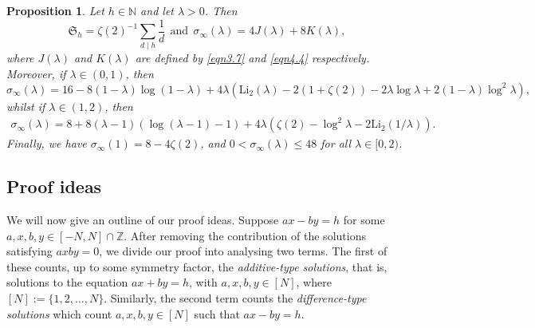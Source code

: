 \documentclass[12pt,reqno]{amsart}
\newtheorem{proposition}[theorem]{Proposition}
\theoremstyle{definition}
\theoremstyle{remark}
\numberwithin{equation}{section}
\def \fS {\mathfrak S}
\def \Li {\mathrm{Li}}
\newcommand\1{\mathds{1}}
\begin{document}
\begin{proposition}\label{prop1.5}
    Let $h \in \mathbb{N}$ and let $\lambda >0$. Then
    \begin{equation}\label{eqn1.4}
    \fS_h= \zeta(2)^{-1}\sum_{d\mid h}\frac{1}{d} \ \ \text{and} \ \  \sigma_{\infty}(\lambda) = 4J(\lambda) + 8K(\lambda),
    \end{equation}
    where $J(\lambda)$ and $K(\lambda)$ are defined by \eqref{eqn3.7} and \eqref{eqn4.4} respectively. Moreover, if $\lambda \in (0,1)$, then
    \begin{equation*}
        \sigma_\infty(\lambda) = 16 - 8(1-\lambda)\log(1-\lambda) + 4\lambda(\Li_2(\lambda) - 2(1+\zeta(2)) - 2\lambda\log\lambda + 2(1-\lambda)\log^2\lambda),
    \end{equation*}
    whilst if $\lambda \in (1,2)$, then
    \begin{align*}
    \sigma_{\infty}(\lambda)=
        8 + 8(\lambda-1)(\log(\lambda - 1) - 1) + 4\lambda(\zeta(2) - \log^2 \lambda - 2\Li_2(1/\lambda)).
    \end{align*}
    Finally, we have $\sigma_\infty(1) = 8-4\zeta(2)$, and $0<\sigma_\infty(\lambda)\leqslant 48$ for all $\lambda\in[0,2)$.
\end{proposition}

\subsection*{Proof ideas}
We will now give an outline of our proof ideas. 
Suppose $ax - by = h$ for some $a,x,b,y \in [-N,N] \cap \mathbb{Z}$. After removing the contribution of the solutions satisfying $axby = 0$, we divide our proof into analysing two terms. The first of these counts, up to some symmetry factor, the \emph{additive-type solutions}, that is, solutions to the equation $ax + by = h$, with $a,x,b,y \in [N]$, where $[N] := \{1,2,\dots, N\}$. Similarly, the second term counts the \emph{difference-type solutions} which count $a,x,b,y \in [N]$ such that $ax - by = h$.
\end{document}
